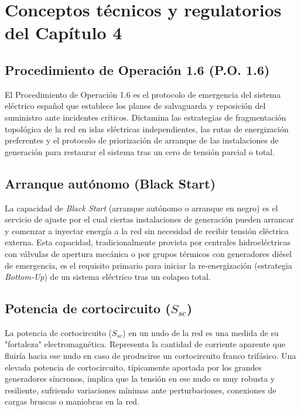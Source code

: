 
\chapter{Conceptos técnicos y regulatorios del Capítulo 4}
\label{anexo:conceptos_cap4}

\section{Procedimiento de Operación 1.6 (P.O. 1.6)}
\label{anexo:po16}
El Procedimiento de Operación 1.6 es el protocolo de emergencia del sistema eléctrico español que establece los planes de salvaguarda y reposición del suministro ante incidentes críticos. Dictamina las estrategias de fragmentación topológica de la red en islas eléctricas independientes, las rutas de energización preferentes y el protocolo de priorización de arranque de las instalaciones de generación para restaurar el sistema tras un cero de tensión parcial o total.

\section{Arranque autónomo (Black Start)}
\label{anexo:black_start}
La capacidad de \textit{Black Start} (arranque autónomo o arranque en negro) es el servicio de ajuste por el cual ciertas instalaciones de generación pueden arrancar y comenzar a inyectar energía a la red sin necesidad de recibir tensión eléctrica externa. Esta capacidad, tradicionalmente provista por centrales hidroeléctricas con válvulas de apertura mecánica o por grupos térmicos con generadores diésel de emergencia, es el requisito primario para iniciar la re-energización (estrategia \textit{Bottom-Up}) de un sistema eléctrico tras un colapso total.

\section{Potencia de cortocircuito ($S_{sc}$)}
\label{anexo:potencia_cortocircuito}
La potencia de cortocircuito ($S_{sc}$) en un nudo de la red es una medida de su "fortaleza" electromagnética. Representa la cantidad de corriente aparente que fluiría hacia ese nudo en caso de producirse un cortocircuito franco trifásico. Una elevada potencia de cortocircuito, típicamente aportada por los grandes generadores síncronos, implica que la tensión en ese nudo es muy robusta y resiliente, sufriendo variaciones mínimas ante perturbaciones, conexiones de cargas bruscas o maniobras en la red.

